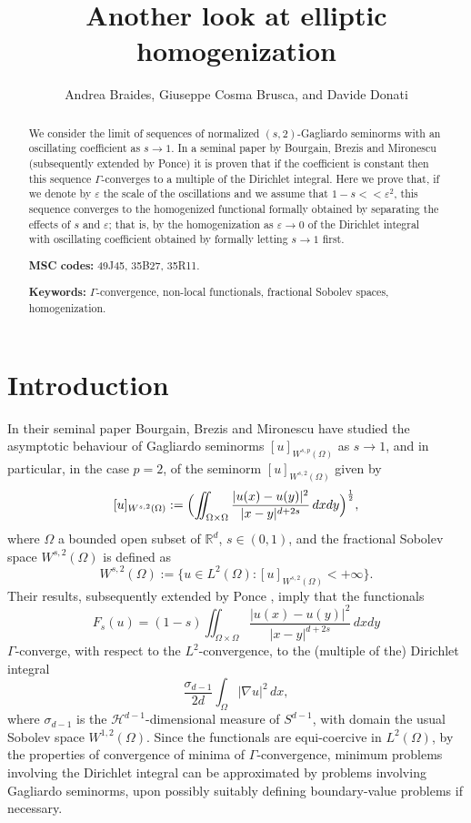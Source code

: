 \documentclass[11pt,a4paper,reqno]{amsart}
\title{Another look at elliptic homogenization}
\author{Andrea Braides, Giuseppe Cosma Brusca, and Davide Donati}
\theoremstyle{plain}
\theoremstyle{definition}
\newcommand\e{\varepsilon}
\newcommand\R{\mathbb{R}}    %
\theoremstyle{remark}
\begin{document}
\maketitle
\begin{abstract} We consider the limit of sequences of normalized $(s,2)$-Gagliardo seminorms with an oscillating coefficient as $s\to 1$. In a seminal paper by Bourgain, Brezis and Mironescu (subsequently extended by Ponce) it is proven that if the coefficient is constant then this sequence $\Gamma$-converges to a multiple of the Dirichlet integral. Here we prove that, if we denote by $\e$ the scale of the oscillations and we assume that $1-s<\!<\e^2$, this sequence converges to the homogenized functional formally obtained by separating the effects of $s$ and $\e$; that is, by the homogenization as $\e\to 0$ of the Dirichlet integral with oscillating coefficient obtained by formally letting $s\to 1$ first.
\smallskip

{\bf MSC codes:} 49J45, 35B27, 35R11.

{\bf Keywords:} $\Gamma$-convergence, non-local functionals, fractional Sobolev spaces, homogenization.

\end{abstract}



\section{Introduction}
In their seminal paper \cite{bbm} Bourgain, Brezis and Mironescu have studied the asymptotic behaviour of Gagliardo seminorms $[u]_{W^{s,p}(\Omega)}$ as $s\to 1$, and in particular, in the case $p=2$, of the seminorm $[u]_{W^{s,2}(\Omega)}$ given by
\[
[u]_{W^{s,2}(\Omega)}:=\Bigl(\iint_{\Omega\times\Omega}\frac{|u(x)-u(y)|^2}{|x-y|^{d+2s}}\,dxdy\Bigr)^{\frac{1}{2}},
\]
where $\Omega$ a bounded open subset of $\R^d$, $s\in (0,1)$, and the fractional Sobolev space $W^{s,2}(\Omega)$ is defined as
$$
W^{s,2}(\Omega):=\{u\in L^2(\Omega): [u]_{W^{s,2}(\Omega)} < +\infty\}.
$$
Their results, subsequently extended by Ponce \cite{Ponce}, imply that the functionals 
$$
F_s(u)=(1-s)\iint_{\Omega\times\Omega}\frac{|u(x)-u(y)|^2}{|x-y|^{d+2s}}\,dxdy
$$
$\Gamma$-converge, with respect to the $L^2$-convergence, to the (multiple of the) Dirichlet integral
$$
\frac{\sigma_{d-1}}{2d}\int_\Omega |\nabla u|^2\,dx,
$$
where $\sigma_{d-1}$ is the ${\mathcal H}^{d-1}$-dimensional measure of $S^{d-1}$,
with domain the usual Sobolev space $W^{1,2}(\Omega)$. Since the functionals are equi-coercive in $L^2(\Omega)$, by the properties of convergence of minima of $\Gamma$-convergence, minimum problems involving the Dirichlet integral can be approximated by problems involving Gagliardo seminorms, upon possibly suitably defining boundary-value problems if necessary. 
\end{document}
